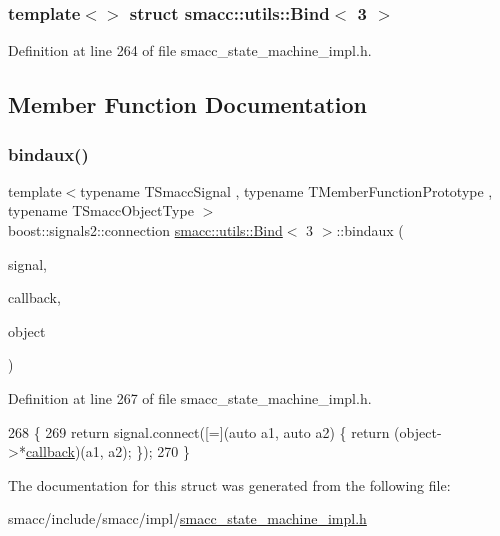 \subsubsection*{template$<$$>$\newline
struct smacc\+::utils\+::\+Bind$<$ 3 $>$}



Definition at line 264 of file smacc\+\_\+state\+\_\+machine\+\_\+impl.\+h.



\subsection{Member Function Documentation}
\mbox{\label{structsmacc_1_1utils_1_1Bind_3_013_01_4_a8958f16a2a40b187e6500a76cfaeed63}} 
\subsubsection{\texorpdfstring{bindaux()}{bindaux()}}
{\footnotesize\ttfamily template$<$typename T\+Smacc\+Signal , typename T\+Member\+Function\+Prototype , typename T\+Smacc\+Object\+Type $>$ \\
boost\+::signals2\+::connection \hyperlink{structsmacc_1_1utils_1_1Bind}{smacc\+::utils\+::\+Bind}$<$ 3 $>$\+::bindaux (\begin{DoxyParamCaption}\item[{T\+Smacc\+Signal \&}]{signal,  }\item[{T\+Member\+Function\+Prototype}]{callback,  }\item[{T\+Smacc\+Object\+Type $\ast$}]{object }\end{DoxyParamCaption})\hspace{0.3cm}{\ttfamily [inline]}}



Definition at line 267 of file smacc\+\_\+state\+\_\+machine\+\_\+impl.\+h.


\begin{DoxyCode}
268   \{
269     \textcolor{keywordflow}{return} signal.connect([=](\textcolor{keyword}{auto} a1, \textcolor{keyword}{auto} a2) \{ \textcolor{keywordflow}{return} (object->*\hyperlink{servers_2opencv__perception__node_2opencv__perception__node_8cpp_a050e697bd654facce10ea3f6549669b3}{callback})(a1, a2); \});
270   \}
\end{DoxyCode}


The documentation for this struct was generated from the following file\+:\begin{DoxyCompactItemize}
\item 
smacc/include/smacc/impl/\hyperlink{smacc__state__machine__impl_8h}{smacc\+\_\+state\+\_\+machine\+\_\+impl.\+h}\end{DoxyCompactItemize}

